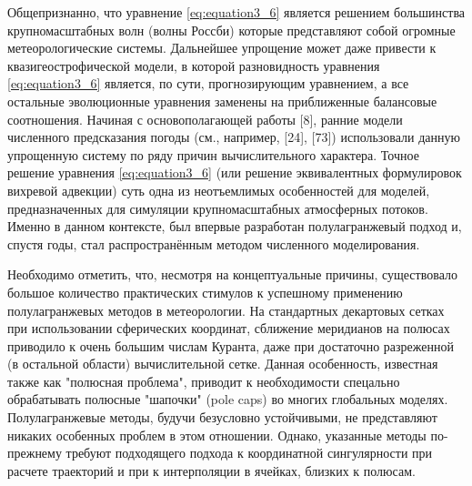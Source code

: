 Общепризнанно, что уравнение \eqref{eq:equation3_6} является решением большинства крупномасштабных волн (волны Россби) которые представляют собой огромные метеорологические системы. Дальнейшее упрощение может даже привести к квазигеострофической модели, в которой разновидность уравнения \eqref{eq:equation3_6} является, по сути, прогнозирующим уравнением, а все остальные эволюционные уравнения заменены на приближенные балансовые соотношения. Начиная с основополагающей работы [8], ранние модели численного предсказания погоды (см., например, [24], [73]) использовали данную упрощенную систему по ряду причин вычислительного характера. Точное решение уравнения \eqref{eq:equation3_6} (или решение эквивалентных формулировок вихревой адвекции) суть одна из неотъемлимых особенностей для моделей, предназначенных для симуляции крупномасштабных атмосферных потоков. Именно в данном контексте, был впервые разработан полулагранжевый подход и, спустя годы, стал распространённым методом численного моделирования.

Необходимо отметить, что, несмотря на концептуальные причины, существовало большое количество практических стимулов к успешному применению полулагранжевых методов в метеорологии. На стандартных декартовых сетках при использовании сферических координат, сближение меридианов на полюсах приводило к очень большим числам Куранта, даже при достаточно разреженной (в остальной области) вычислительной сетке. Данная особенность, известная также как "полюсная проблема", приводит к необходимости спецально обрабатывать полюсные "шапочки" (pole caps) во многих глобальных моделях. Полулагранжевые методы, будучи безусловно устойчивыми, не представляют никаких особенных проблем в этом отношении. Однако, указанные методы по-прежнему требуют подходящего подхода к координатной сингулярности при расчете траекторий и при к интерполяции в ячейках, близких к полюсам.
